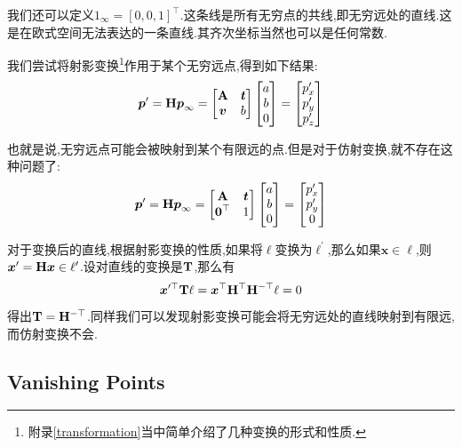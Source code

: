 我们还可以定义$1_\infty = [0, 0, 1]^\top$.这条线是所有无穷点的共线,即无穷远处的直线.这是在欧式空间无法表达的一条直线.其齐次坐标当然也可以是任何常数.

我们尝试将射影变换\footnote{附录\ref{transformation}当中简单介绍了几种变换的形式和性质.}作用于某个无穷远点,得到如下结果:
\begin{equation}
	\boldsymbol p^{\prime}=\bold{H} \boldsymbol p_{\infty}=\begin{bmatrix}
		\bold{A} & \boldsymbol t \\
		\boldsymbol v  & b
	\end{bmatrix}
	\begin{bmatrix}
		a \\
		b \\
		0
	\end{bmatrix}=
	\begin{bmatrix}
		p_{x}^{\prime} \\
		p_{y}^{\prime} \\
		p_{z}^{\prime}
	\end{bmatrix}
\end{equation}

也就是说,无穷远点可能会被映射到某个有限远的点.但是对于仿射变换,就不存在这种问题了:
\begin{equation}
	\boldsymbol p^{\prime}=\bold{H} \boldsymbol p_{\infty}=\begin{bmatrix}
		\bold{A} & \boldsymbol t \\
		\boldsymbol 0^\top & 1
	\end{bmatrix}
	\begin{bmatrix}
		a \\
		b \\
		0
	\end{bmatrix}=
	\begin{bmatrix}
		p_{x}^{\prime} \\
		p_{y}^{\prime} \\
		0
	\end{bmatrix}
\end{equation}

对于变换后的直线,根据射影变换的性质,如果将$\ell$变换为$\ell^\prime$,那么如果$\bm x \in \ell$,则$\boldsymbol x^\prime = \bold{H} \boldsymbol x \in \ell^\prime$.设对直线的变换是$\bold{T}$,那么有
\begin{equation}
	\boldsymbol x^{\prime \top} \bold{T} \ell=\boldsymbol x^{\top} \bold{H}^{\top} \bold{H}^{-\top} \ell=0
\end{equation}
得出$\bold{T} = \bold{H}^{-\top}$.同样我们可以发现射影变换可能会将无穷远处的直线映射到有限远,而仿射变换不会.

\subsection{Vanishing Points}


